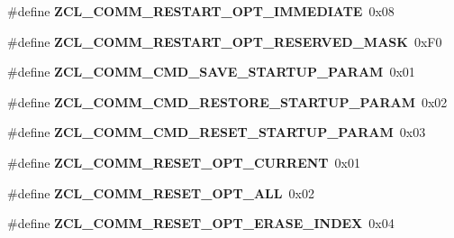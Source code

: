 \begin{DoxyCompactItemize}
\item 
\hypertarget{group__zcl__commissioning_ga817f8447ac8d34320148d87d29083eb9}{\#define {\bfseries Z\-C\-L\-\_\-\-C\-O\-M\-M\-\_\-\-R\-E\-S\-T\-A\-R\-T\-\_\-\-O\-P\-T\-\_\-\-I\-M\-M\-E\-D\-I\-A\-T\-E}~0x08}\label{group__zcl__commissioning_ga817f8447ac8d34320148d87d29083eb9}

\item 
\hypertarget{group__zcl__commissioning_ga99c15c34e5e1845ed2d8fb4285509b21}{\#define {\bfseries Z\-C\-L\-\_\-\-C\-O\-M\-M\-\_\-\-R\-E\-S\-T\-A\-R\-T\-\_\-\-O\-P\-T\-\_\-\-R\-E\-S\-E\-R\-V\-E\-D\-\_\-\-M\-A\-S\-K}~0x\-F0}\label{group__zcl__commissioning_ga99c15c34e5e1845ed2d8fb4285509b21}

\item 
\hypertarget{group__zcl__commissioning_ga55f8c0b2f1ff543e2db57d0d0061d378}{\#define {\bfseries Z\-C\-L\-\_\-\-C\-O\-M\-M\-\_\-\-C\-M\-D\-\_\-\-S\-A\-V\-E\-\_\-\-S\-T\-A\-R\-T\-U\-P\-\_\-\-P\-A\-R\-A\-M}~0x01}\label{group__zcl__commissioning_ga55f8c0b2f1ff543e2db57d0d0061d378}

\item 
\hypertarget{group__zcl__commissioning_gae26e4c1daf77b1b227a34ec10f8fbca0}{\#define {\bfseries Z\-C\-L\-\_\-\-C\-O\-M\-M\-\_\-\-C\-M\-D\-\_\-\-R\-E\-S\-T\-O\-R\-E\-\_\-\-S\-T\-A\-R\-T\-U\-P\-\_\-\-P\-A\-R\-A\-M}~0x02}\label{group__zcl__commissioning_gae26e4c1daf77b1b227a34ec10f8fbca0}

\item 
\hypertarget{group__zcl__commissioning_gabba1a2fe6591ee8038fec2e191eca9b8}{\#define {\bfseries Z\-C\-L\-\_\-\-C\-O\-M\-M\-\_\-\-C\-M\-D\-\_\-\-R\-E\-S\-E\-T\-\_\-\-S\-T\-A\-R\-T\-U\-P\-\_\-\-P\-A\-R\-A\-M}~0x03}\label{group__zcl__commissioning_gabba1a2fe6591ee8038fec2e191eca9b8}

\item 
\hypertarget{group__zcl__commissioning_ga087ee46259b56cfcf97b32e7d1e1452b}{\#define {\bfseries Z\-C\-L\-\_\-\-C\-O\-M\-M\-\_\-\-R\-E\-S\-E\-T\-\_\-\-O\-P\-T\-\_\-\-C\-U\-R\-R\-E\-N\-T}~0x01}\label{group__zcl__commissioning_ga087ee46259b56cfcf97b32e7d1e1452b}

\item 
\hypertarget{group__zcl__commissioning_ga5079436c4ae18d83818e6b0b60547950}{\#define {\bfseries Z\-C\-L\-\_\-\-C\-O\-M\-M\-\_\-\-R\-E\-S\-E\-T\-\_\-\-O\-P\-T\-\_\-\-A\-L\-L}~0x02}\label{group__zcl__commissioning_ga5079436c4ae18d83818e6b0b60547950}

\item 
\hypertarget{group__zcl__commissioning_ga63e2335a40e97cd04926ac430068a672}{\#define {\bfseries Z\-C\-L\-\_\-\-C\-O\-M\-M\-\_\-\-R\-E\-S\-E\-T\-\_\-\-O\-P\-T\-\_\-\-E\-R\-A\-S\-E\-\_\-\-I\-N\-D\-E\-X}~0x04}\label{group__zcl__commissioning_ga63e2335a40e97cd04926ac430068a672}


\end{DoxyCompactItemize}
